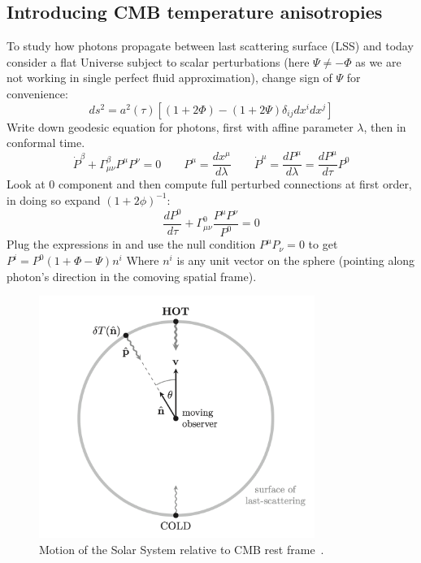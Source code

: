 \subsection{Introducing CMB temperature anisotropies}\label{sec:CMBAnisotropies}
To study how photons propagate between last scattering surface (LSS) and today consider a flat Universe subject to scalar perturbations (here $\Psi \neq -\Phi$ as we are not working in single perfect fluid approximation), change sign of $\Psi$ for convenience:
\begin{equation}
    ds^2 = a^2(\tau)\left[\left(1+2\Phi\right) - \left(1+2\Psi\right) \delta_{ij} dx^idx^j\right]
\end{equation}
Write down geodesic equation for photons, first with affine parameter $\lambda$, then in conformal time.
\begin{equation}
    \dot{P}^\beta + \Gamma^\beta_{\mu\nu}P^\mu P^\nu = 0 \qquad P^\mu= \frac{dx^\mu}{d \lambda} \qquad \dot{P}^\mu= \frac{dP^\mu}{d \lambda} = \frac{dP^\mu}{d \tau} P^0
\end{equation}
Look at $0$ component and then compute full perturbed connections at first order, in doing so expand $(1+2\phi)^{-1}$:
\begin{equation}
   \frac{dP^0}{d \tau} + \Gamma^0_{\mu\nu}\frac{P^\mu P^\nu}{P^0} = 0 
\end{equation}
Plug the expressions in and use the null condition $P^{\mu}P_{\nu}=0$ to get $P^i = P^0 \left(1+\Phi -\Psi \right) n^i$ 
Where $n^i$ is any unit vector on the sphere (pointing along photon's direction in the comoving spatial frame).
\begin{figure}[h]
      \centering
        \includegraphics[width=0.8\textwidth]{Graphics/CMB-doppler.png}
        \caption{Motion of the Solar System relative to CMB rest frame~\cite{CosmologyBau}.}
  \end{figure}
